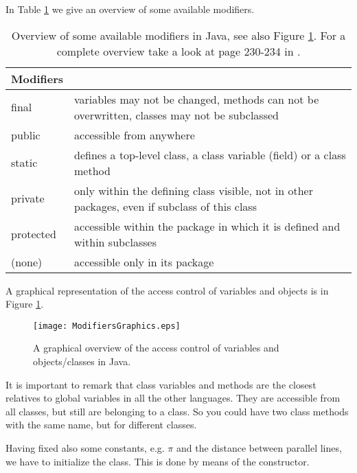 In Table \ref{tab:modifiers} we give an overview of some available modifiers.
\begin{table}[htbp]
  \begin{center}
    \leavevmode
    \begin{tabular}{l|p{8cm}}
     Modifiers &                                 \\ \hline \hline
     final & variables may not be changed, methods can not be overwritten,
             classes may not be subclassed\\\hline
     public & accessible from anywhere\\ \hline
     static & defines a top-level class, a class variable (field) or 
                 a class method\\\hline
     private & only within the defining class visible, not in other 
               packages, even if subclass of this class\\\hline
     protected & accessible within the package in which it is defined and
                 within subclasses\\\hline
     (none) & accessible only in its package\\
    \end{tabular}
    \caption{Overview of some available modifiers in Java, see also Figure
      \ref{fig:ModifiersGraphics}. For a complete
      overview take a look at page 230-234 in \cite{javanutshell}.}
    \label{tab:modifiers}
  \end{center}
\end{table}
A graphical representation of the access control of variables and
objects is in Figure \ref{fig:ModifiersGraphics}.
\begin{figure}[htbp]
  \begin{center}
    \texttt{[image: ModifiersGraphics.eps]}
    \caption{A graphical overview of the access 
      control of variables and objects/classes in Java.}
    \label{fig:ModifiersGraphics}
  \end{center}
\end{figure}

It is important to remark that
class variables and methods are the closest relatives to global 
variables in all the other languages. They are accessible from all
classes, but still are belonging to a class. So you could have two
class methods with the same name, but for different classes.

Having fixed also some constants, e.g. $\pi$ and the distance between
parallel lines, we have to initialize the class. This is done by means
of the constructor.

